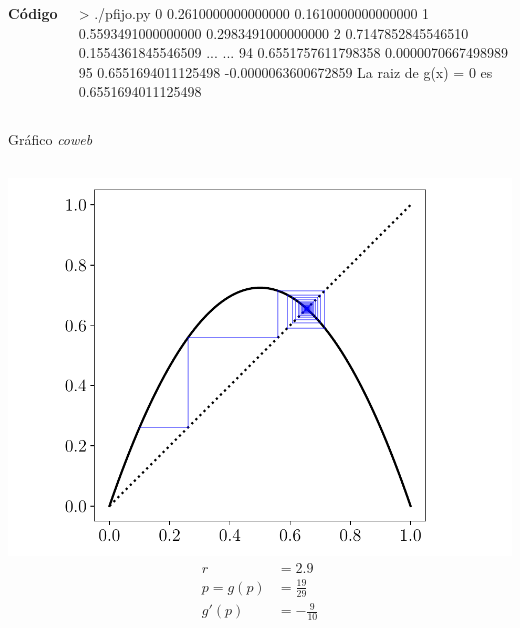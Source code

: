 \documentclass[9pt, aspectratio=169]{beamer}
\begin{document}
\begin{frame}[fragile]
    \begin{columns}[t]
\textbf{Código}


\begin{shell}
> ./pfijo.py 
  0 0.2610000000000000 0.1610000000000000
  1 0.5593491000000000 0.2983491000000000
  2 0.7147852845546510 0.1554361845546509
... ... 
 94 0.6551757611798358 0.0000070667498989
 95 0.6551694011125498 -0.0000063600672859
La raiz de g(x) = 0 es 0.6551694011125498
\end{shell}
\end{columns}
\end{frame}

\begin{frame}{Gráfico \textit{coweb}}
\begin{columns}
\begin{center}
    \includegraphics[scale=0.35]{figs/coweb-01.pdf}
    \begin{align*}
        r &= 2.9 \\
    p = g(p) &= \frac{19}{29} \\
    g'(p) &= -\frac{9}{10}
    \end{align*}
\end{center} \pause


\end{columns}
\end{frame}
\end{document}
